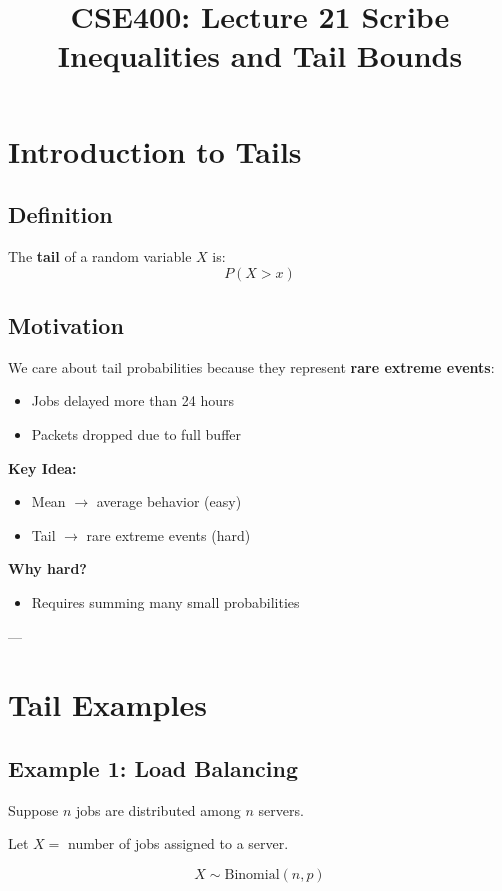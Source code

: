 \documentclass[12pt]{article}
\title{CSE400: Lecture 21 Scribe \\ Inequalities and Tail Bounds}
\author{}
\date{}
\begin{document}
\maketitle

\section{Introduction to Tails}

\subsection{Definition}
The \textbf{tail} of a random variable $X$ is:
\[
P(X > x)
\]

\subsection{Motivation}
We care about tail probabilities because they represent \textbf{rare extreme events}:
\begin{itemize}
    \item Jobs delayed more than 24 hours
    \item Packets dropped due to full buffer
\end{itemize}

\textbf{Key Idea:}
\begin{itemize}
    \item Mean $\rightarrow$ average behavior (easy)
    \item Tail $\rightarrow$ rare extreme events (hard)
\end{itemize}

\textbf{Why hard?}
\begin{itemize}
    \item Requires summing many small probabilities
\end{itemize}

---

\section{Tail Examples}

\subsection{Example 1: Load Balancing}
Suppose $n$ jobs are distributed among $n$ servers.

Let $X =$ number of jobs assigned to a server.

\[
X \sim \text{Binomial}(n,p)
\]
\end{document}
